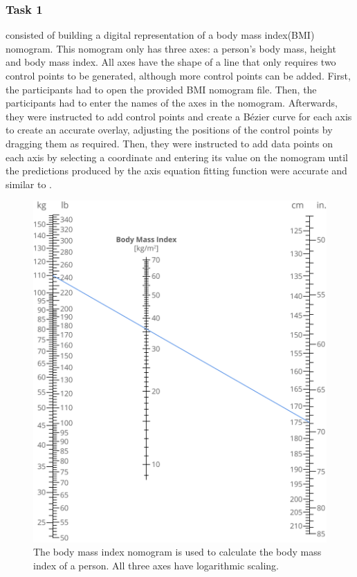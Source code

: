 \documentclass{l4proj}
\begin{document}
\subsubsection{Task 1} consisted of building a digital representation of a body mass index(BMI) nomogram. This nomogram only has three axes: a person's body mass, height and body mass index. All axes have the shape of a line that only requires two control points to be generated, although more control points can be added. First, the participants had to open the provided BMI nomogram file. Then, the participants had to enter the names of the axes in the nomogram. Afterwards, they were instructed to add control points and create a Bézier curve for each axis to create an accurate overlay, adjusting the positions of the control points by dragging them as required. Then, they were instructed to add data points on each axis by selecting a coordinate and entering its value on the nomogram until the predictions produced by the axis equation fitting function were accurate and similar to . 
\begin{figure}[H]
    \centering
    \includegraphics[width=0.8\linewidth]{dissertation//images//myFigures//appendix/bmi.png}
    \caption{The body mass index nomogram is used to calculate the body mass index of a person. All three axes have logarithmic scaling. \citep{merson-davies_body_2020}}
    \label{fig:bmi-nomogram}
\end{figure}
\end{document}
